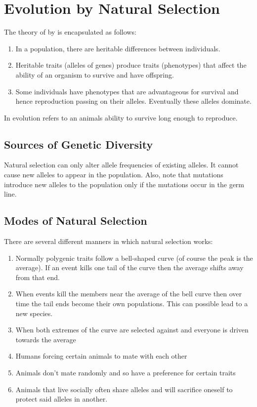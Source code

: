 \documentclass[../Bio_chemistryReview.tex]{subfiles}
\begin{document}
\section{Evolution by Natural Selection}
The theory of  by  is encapsulated
as follows:
\begin{enumerate}
  \item In a population, there are heritable differences between individuals.
  \item Heritable traits (alleles of genes) produce traits (phenotypes) that
    affect the ability of an organism to survive and have offspring.
  \item Some individuals have phenotypes that are advantageous for survival
    and hence reproduction passing on their alleles. Eventually these alleles
    dominate.
\end{enumerate}
In evolution  refers to an animals ability to survive long
enough to reproduce.

\subsection{Sources of Genetic Diversity}
Natural selection can only alter allele frequencies of existing alleles. It
cannot cause new alleles to appear in the population. Also, note that mutations
introduce new alleles to the population only if the mutations occur in the
germ line.

\subsection{Modes of Natural Selection}
There are several different manners in which natural selection works:

\begin{enumerate}
  \item {} Normally polygenic traits follow a
    bell-shaped curve (of course the peak is the average). If an event kills one
    tail of the curve then the average shifts away from that end.
  \item {} When events kill the members near the
    average of the bell curve then over time the tail ends become their own
    populations. This can possible lead to a new species.
  \item {} When both extremes of the curve are
    selected against and everyone is driven towards the average
  \item {} Humans forcing certain animals to mate
    with each other
  \item {} Animals don't mate randomly and so have a
    preference for certain traits
  \item {} Animals that live socially often share alleles
    and will sacrifice oneself to protect said alleles in another.
\end{enumerate}
\end{document}
